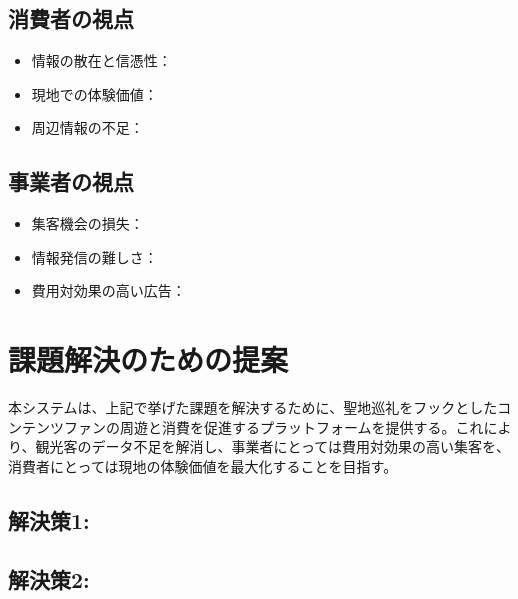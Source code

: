 \documentclass[a4j, 11pt, report]{jsarticle}
\begin{document}
\subsection{消費者の視点}
\begin{itemize}
    \item 情報の散在と信憑性：
    \item 現地での体験価値：
    \item 周辺情報の不足：
\end{itemize}


\subsection{事業者の視点}
\begin{itemize}
    \item 集客機会の損失：
    \item 情報発信の難しさ：
    \item 費用対効果の高い広告： 
\end{itemize}

\section{課題解決のための提案}

本システムは、上記で挙げた課題を解決するために、聖地巡礼をフックとしたコンテンツファンの周遊と消費を促進するプラットフォームを提供する。これにより、観光客のデータ不足を解消し、事業者にとっては費用対効果の高い集客を、消費者にとっては現地の体験価値を最大化することを目指す。



\subsection{解決策1: }

\subsection{解決策2: }

\end{document}
